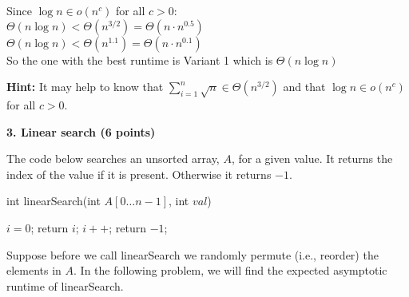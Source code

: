 \documentclass[12pt]{elsart}
\begin{document}
Since $\log n \in o(n^c)$ for all $c > 0$:\\
$\Theta(n\log n) < \Theta(n^{3/2}) = \Theta(n \cdot n^{0.5})$\\
$\Theta(n\log n) < \Theta(n^{1.1}) = \Theta(n \cdot n^{0.1})$\\
So the one with the best runtime is Variant 1 which is $\Theta(n\log n)$

{\bf Hint:} It may help to know that $\sum\limits_{i=1}^n \sqrt{n} \in \Theta(n^{3/2})$ and that $\log n \in o(n^c)$ for all $c>0$.

{\bf 3. Linear search (6 points)}

The code below searches an unsorted array, $A$, for a given value.  It returns the index of the value if it is present.  Otherwise it returns $-1$.

\begin{algorithm}
\caption{int linearSearch(int $A[0\ldots n-1]$, int $val$)}
 \begin{algorithmic}
 \State $i = 0$;
       \State return $i$;
    \EndIf
    \State $i++$;
  \EndWhile
 \State return $-1$;
\end{algorithmic}
\end{algorithm}

Suppose before we call linearSearch we randomly permute (i.e., reorder) the elements in $A$.  In the following problem, we will find the expected asymptotic runtime of linearSearch.
\end{document}
